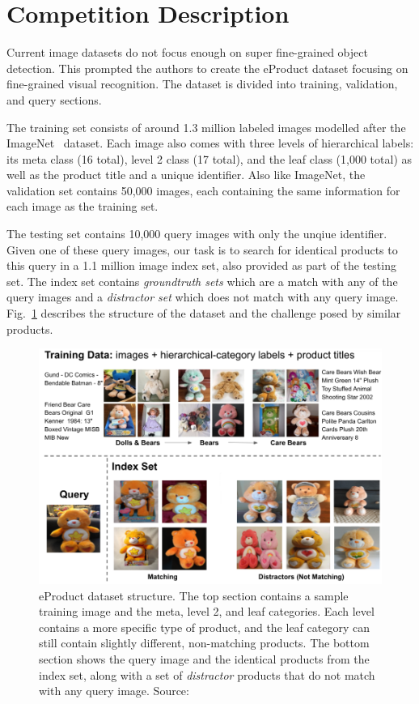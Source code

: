 \documentclass[conference]{IEEEtran}
\begin{document}
\section{Competition Description}
\label{sec:description}
Current image datasets do not focus enough on super fine-grained object detection.
This prompted the authors to create the eProduct dataset focusing on fine-grained
visual recognition.
The dataset is divided into training, validation, and query sections. 

The training set consists of around 1.3 million labeled images modelled after the ImageNet~\cite{deng2009imagenet} dataset.
Each image also comes with three levels of hierarchical labels: its meta class (16 total), level 2 class (17 total),
and the leaf class (1,000 total) as well as the product title and a unique identifier.
Also like ImageNet, the validation set contains 50,000 images, each containing the same information 
for each image as the training set.

The testing set contains 10,000 query images with only the unqiue identifier.
Given one of these query images, our task is to search for identical products to this query in a 1.1 million image index set, also provided
as part of the testing set.
The index set contains \emph{groundtruth sets} which are a match with any of the query images and 
a \emph{distractor set} which does not match with any query image.
Fig.~\ref{fig:structure} describes the structure of the dataset and the challenge posed by similar products.

\begin{figure}[!t]
\centering
\includegraphics[scale=0.25]{structure}
\caption{eProduct dataset structure. The top section contains a sample training image and the meta,
level 2, and leaf categories. Each level contains a more specific type of product, and the leaf category
can still contain slightly different, non-matching products. 
The bottom section shows the query image and the identical products from the index set, along with a set 
of \emph{distractor} products that do not match with any query image.
Source:~\cite{jiangbo2021ebay}}

\label{fig:structure}
\end{figure}
\end{document}
